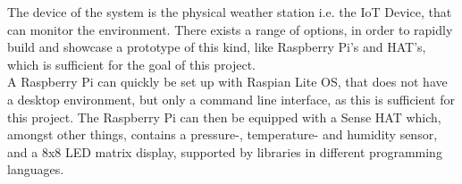 The device of the system is the physical weather station i.e. the IoT Device, that can monitor the environment. There exists a range of options, in order to rapidly build and showcase a prototype of this kind, like Raspberry Pi's and HAT's, which is sufficient for the goal of this project.\\

A Raspberry Pi can quickly be set up with Raspian Lite OS, that does not have a desktop environment, but only a command line interface, as this is sufficient for this project. The Raspberry Pi can then be equipped with a Sense HAT which, amongst other things, contains a pressure-, temperature- and humidity sensor, and a 8x8 LED matrix display, supported by libraries in different programming languages.

